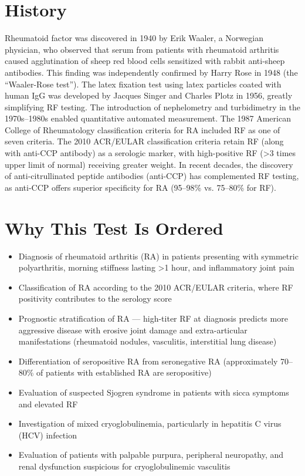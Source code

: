 \section*{History}
Rheumatoid factor was discovered in 1940 by Erik Waaler, a Norwegian physician, who observed that serum from patients with rheumatoid arthritis caused agglutination of sheep red blood cells sensitized with rabbit anti-sheep antibodies. This finding was independently confirmed by Harry Rose in 1948 (the ``Waaler-Rose test''). The latex fixation test using latex particles coated with human IgG was developed by Jacques Singer and Charles Plotz in 1956, greatly simplifying RF testing. The introduction of nephelometry and turbidimetry in the 1970s--1980s enabled quantitative automated measurement. The 1987 American College of Rheumatology classification criteria for RA included RF as one of seven criteria. The 2010 ACR/EULAR classification criteria retain RF (along with anti-CCP antibody) as a serologic marker, with high-positive RF (>3 times upper limit of normal) receiving greater weight. In recent decades, the discovery of anti-citrullinated peptide antibodies (anti-CCP) has complemented RF testing, as anti-CCP offers superior specificity for RA (95--98\% vs. 75--80\% for RF).

\section*{Why This Test Is Ordered}
\begin{itemize}
  \item Diagnosis of rheumatoid arthritis (RA) in patients presenting with symmetric polyarthritis, morning stiffness lasting >1 hour, and inflammatory joint pain
  \item Classification of RA according to the 2010 ACR/EULAR criteria, where RF positivity contributes to the serology score
  \item Prognostic stratification of RA --- high-titer RF at diagnosis predicts more aggressive disease with erosive joint damage and extra-articular manifestations (rheumatoid nodules, vasculitis, interstitial lung disease)
  \item Differentiation of seropositive RA from seronegative RA (approximately 70--80\% of patients with established RA are seropositive)
  \item Evaluation of suspected Sjogren syndrome in patients with sicca symptoms and elevated RF
  \item Investigation of mixed cryoglobulinemia, particularly in hepatitis C virus (HCV) infection
  \item Evaluation of patients with palpable purpura, peripheral neuropathy, and renal dysfunction suspicious for cryoglobulinemic vasculitis
\end{itemize}

